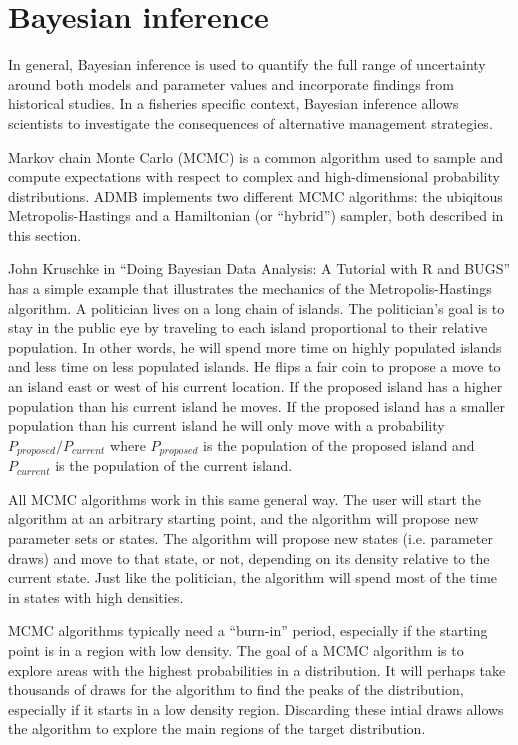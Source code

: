 \documentclass{article}\usepackage[]{graphicx}\usepackage[]{color}
\begin{document}
  
  
\section{Bayesian inference}
In general, Bayesian inference is used to quantify the full
range of uncertainty around both models and parameter values
and incorporate findings from historical studies. In a
fisheries specific context, Bayesian inference allows
scientists to investigate the consequences of alternative
management strategies.

Markov chain Monte Carlo (MCMC) is a common algorithm used
to sample and compute expectations with respect to complex
and high-dimensional probability distributions.  ADMB
implements two different MCMC algorithms: the ubiqitous
Metropolis-Hastings and a Hamiltonian (or ``hybrid'')
sampler, both described in this section.

John Kruschke in ``Doing Bayesian Data Analysis: A Tutorial
with R and BUGS'' has a simple example that illustrates the
mechanics of the Metropolis-Hastings algorithm. A politician
lives on a long chain of islands. The politician's goal is
to stay in the public eye by traveling to each island
proportional to their relative population. In other words,
he will spend more time on highly populated islands and less
time on less populated islands. He flips a fair coin to
propose a move to an island east or west of his current
location. If the proposed island has a higher population
than his current island he moves. If the proposed island has
a smaller population than his current island he will only
move with a probability $P_{proposed} / P_{current}$ where
$P_{proposed}$ is the population of the proposed island and
$P_{current}$ is the population of the current island.

All MCMC algorithms work in this same general way. The user
will start the algorithm at an arbitrary starting point, and
the algorithm will propose new parameter sets or states. The
algorithm will propose new states (i.e. parameter draws) and
move to that state, or not, depending on its density
relative to the current state. Just like the politician, the
algorithm will spend most of the time in states with high
densities.

MCMC algorithms typically need a ``burn-in'' period,
especially if the starting point is in a region with low
density. The goal of a MCMC algorithm is to explore areas
with the highest probabilities in a distribution. It will
perhaps take thousands of draws for the algorithm to find
the peaks of the distribution, especially if it starts in a
low density region. Discarding these intial draws allows the
algorithm to explore the main regions of the target
distribution.
\end{document}

